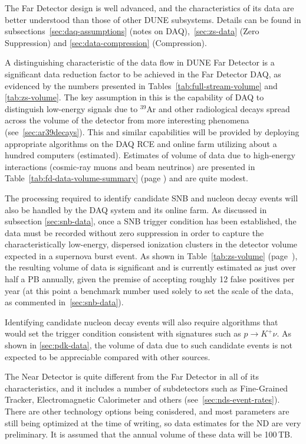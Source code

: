 The Far Detector design is well advanced, and the characteristics of its data are better understood than those of other
DUNE subsystems.  Details can be found in subsections~\ref{sec:daq-assumptions} (notes on DAQ),~\ref{sec:zs-data} 
(Zero Suppression) and \ref{sec:data-compression} (Compression).

A distinguishing characteristic of the data flow in DUNE Far Detector is a significant data reduction factor to be achieved
in the Far Detector DAQ, as evidenced by the numbers presented in Tables~\ref{tab:full-stream-volume} and \ref{tab:zs-volume}.
The key assumption in this is the capability of DAQ to distinguish low-energy signals due to $^{39}$Ar and other radiological decays spread
across the volume of the detector from more interesting phenomena (see~\ref{sec:ar39decays}).
This and similar capabilities will be provided
by deploying appropriate algorithms on the DAQ RCE and online farm utilizing about a hundred computers (estimated).
Estimates of volume of data due to high-energy interactions (cosmic-ray muons and beam neutrinos) are presented in
Table~\ref{tab:fd-data-volume-summary} (page \pageref{tab:fd-data-volume-summary}) and are quite modest.

The processing required to identify candidate SNB and nucleon decay events will also be handled by the DAQ system and its online farm.
As discussed in subsection \ref{sec:snb-data}, once a SNB trigger condition has been established, the data must
be recorded without zero suppression in order to capture the characteristically low-energy, dispersed ionization
clusters in the detector volume expected in a supernova burst event. As shown in Table~\ref{tab:zs-volume} (page~\pageref{tab:zs-volume}),
the resulting volume of data is significant and is currently estimated as just over half a PB annually, given the premise of accepting roughly
12 false positives per year (at this point a benchmark number used solely to set the scale of the data, as commented in~\ref{sec:snb-data}).

Identifying candidate nucleon decay events will also require algorithms that would set the trigger condition consistent
with signatures such as $p \rightarrow K^+\nu$. As shown in \ref{sec:pdk-data}, the volume of data due to such candidate
events is not expected to be appreciable compared with other sources.

The Near Detector is quite different from the Far Detector in all of its characteristics, and it includes a number of subdetectors
such as Fine-Grained Tracker, Electromagnetic Calorimeter and others (see~\ref{sec:nds-event-rates}). There are other technology
options being conisdered, and most parameters are still being optimized at the time of writing, so data estimates for the ND are very preliminary.
It is
assumed that the annual volume of these data will be 100\,TB.


